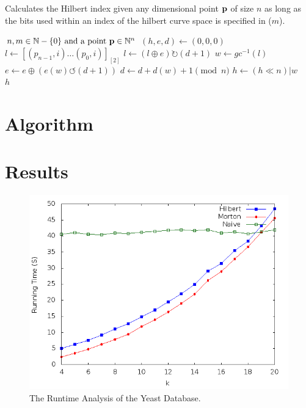 \documentclass[10pt]{article}
\begin{document}
\begin{algorithm}
  \caption{Calculates the Hilbert index given any dimensional point ${\bf p}$ 
    of size $n$ as long as the bits used within an index of the hilbert curve 
    space is specified in ($m$).}
  \label{hilbert-point-to-index}
  \begin{algorithmic}[1]
    \Require $n, m \in \mathbb{N} - \{0\} \text{ and a point } {\bf p} \in \mathbb{N}^n$ 
    \State $ \left( h, e, d \right) \leftarrow \left( 0, 0, 0 \right) $
    \State $ l \leftarrow \left[ \left( p_{n-1} , i \right) \ldots \left( p_0 , i \right) \right]_{\left[ 2 \right]} $ 
    \State $ l \leftarrow \left( l \oplus e \right) \rightturn \left( d+1 \right)$ 
    \State $ w \leftarrow gc^{-1} \left( l \right)$ 
    \State $ e \leftarrow e \oplus \left( e \left( w \right) \leftturn \left( d+ 1 \right) \right) $ 
    \State $ d \leftarrow d + d \left( w \right) + 1 \pmod{n}$ 
    \State $ h \leftarrow \left( h \ll n \right) | w $
    \EndFor \\
    \Return $h $%

  \end{algorithmic}
\end{algorithm}

\section{Algorithm}

\section{Results}

\begin{figure}
\begin{center}
\includegraphics[scale=0.5]{YeaGra.png}
\caption{The Runtime Analysis of the Yeast Database.}
\label{run-yeast}
\end{center}
\end{figure}
\end{document}
